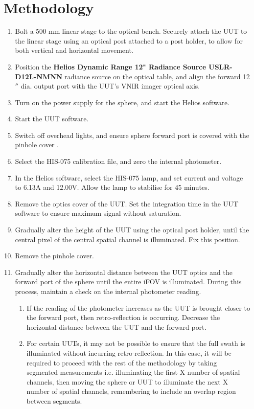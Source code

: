 \documentclass[nohyper,nobib]{tufte-book}
\begin{document}
\chapter{Methodology}
\label{ch:radiometricmethod}
\begin{enumerate}
	\item Bolt a 500 mm linear stage to the optical bench. Securely attach the UUT to the linear stage using an optical post attached to a post holder, to allow for both vertical and horizontal movement.
	\item Position the \textbf{Helios Dynamic Range 12" Radiance Source USLR-D12L-NMNN} radiance source on the optical table, and align the forward 12$''$ dia. output port with the UUT's VNIR imager optical axis. 
	\item Turn on the power supply for the sphere, and start the Helios software.
	\item Start the UUT software. 
	 \item Switch off overhead lights, and ensure sphere forward port is covered with the pinhole cover .
	\item  Select the HIS-075 calibration file, and zero the internal photometer. 
	\item In the Helios software, select the HIS-075 lamp, and set current and voltage to 6.13A and 12.00V. Allow the lamp to stabilise for 45 minutes. 
	\item Remove the optics cover of the UUT. Set the integration time in the UUT software to ensure maximum signal without saturation. 
	\item Gradually alter the height of the UUT using the optical post holder, until the central pixel of the central spatial channel is illuminated. Fix this position. 
	\item Remove the pinhole cover. 
	\item Gradually alter the horizontal distance between the UUT optics and the forward port of the sphere until the entire iFOV is illuminated. During this process, maintain a check on the internal photometer reading.
		\begin{enumerate}
			\item If the reading of the photometer increases as the UUT is brought closer to the forward port, then retro-reflection is occurring. Decrease the horizontal distance between the UUT and the forward port.
			\item For certain UUTs, it may not be possible to ensure that the full swath is illuminated without incurring retro-reflection. In this case, it will be required to proceed with the rest of the methodology by taking segmented measurements i.e. illuminating the first X number of spatial channels, then moving the sphere or UUT to illuminate the next X number of spatial channels, remembering to include an overlap region between segments. 

\end{enumerate}
\end{enumerate}
\end{document}
